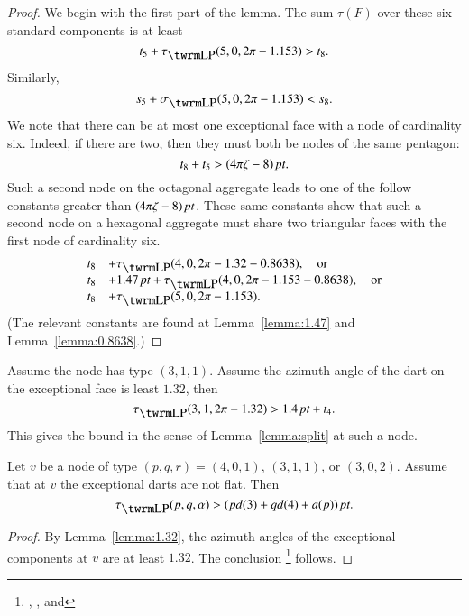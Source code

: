 \begin{proof}
We begin with the first part of the lemma. The sum  $\tau(F)$ over
these six standard components is at least
    $$t_5+\tauLP(5,0,2\pi-1.153)> t_8.$$
Similarly,
    $$s_5+\sLP(5,0,2\pi-1.153)<s_8.$$
%
We note that there can be at most one exceptional face with a node
of cardinality six.  Indeed, if there are two, then they must both
be nodes of the same pentagon:
    $$t_8+t_5>(4\pi\zeta-8)\,\hbox{\it pt}.$$
Such a second node on the octagonal aggregate leads to one of the
follow constants greater than $(4\pi\zeta-8)\,\hbox{\it pt}$.  These same constants
show that such a second node on a hexagonal aggregate must share two
triangular faces with the first node of cardinality six.
$$\begin{array}{lll}
    t_8 &+\tauLP(4,0,2\pi-1.32-0.8638),\quad\text{or}\\
    t_8 &+1.47\,\pt+\tauLP(4,0,2\pi-1.153-0.8638),\quad\text{or}\\
    t_8 &+\tauLP(5,0,2\pi-1.153) .
\end{array}
$$
(The relevant constants are found at Lemma~\ref{lemma:1.47} and
Lemma~\ref{lemma:0.8638}.)
\end{proof}

\begin{lemma}\label{a:311}  %
Assume the node has type $(3,1,1)$.
 Assume the azimuth angle of the dart on the exceptional face is
least $1.32$, then
    \begin{equation}
    \tauLP(3,1,2\pi-1.32)>1.4\,\pt + t_4.
    \label{eqn:tau1.32}
    \end{equation}
This gives the bound in the sense of Lemma~\ref{lemma:split} at such
a node. 
\end{lemma}

\begin{lemma}\label{a:no-ef}  Let $v$ be a node of type
$(p,q,r)=(4,0,1)$, $(3,1,1)$, or $(3,0,2)$.  Assume that at $v$ the
exceptional darts are not flat.  Then
    $$\tauLP(p,q,\alpha) > ( p d(3) + q d(4) + a(p))\,\pt.$$
\end{lemma}

\begin{proof}
By Lemma~\ref{lemma:1.32},
the azimuth angles of the
exceptional components at $v$ are at least $1.32$.   The conclusion%
\footnote{, , and
}
follows.
\end{proof}

